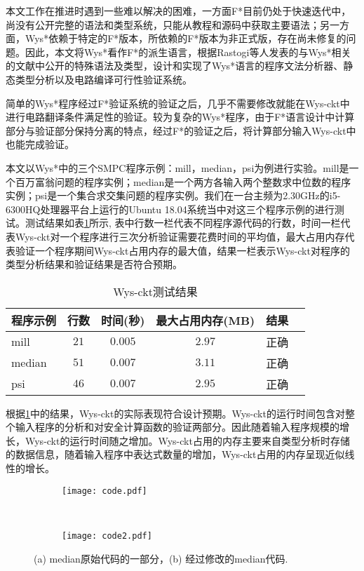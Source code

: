 本文工作在推进时遇到一些难以解决的困难，一方面F*目前仍处于快速迭代中，尚没有公开完整的语法和类型系统，只能从教程和源码中获取主要语法；另一方面，Wys*依赖于特定的F*版本，所依赖的F*版本为非正式版，存在尚未修复的问题。因此，本文将Wys*看作F*的派生语言，根据Rastogi等人发表的与Wys*相关的文献\citep{rastogi2017wys, rastogi2014wysteria,rastogi2019textsc}中公开的特殊语法及类型，设计和实现了Wys*语言的程序文法分析器、静态类型分析以及电路编译可行性验证系统。

简单的Wys*程序经过F*验证系统的验证之后，几乎不需要修改就能在Wys-ckt中进行电路翻译条件满足性的验证。较为复杂的Wys*程序，由于F*语言设计中计算部分与验证部分保持分离的特点，经过F*的验证之后，将计算部分输入Wys-ckt中也能完成验证。

本文以Wys*中的三个SMPC程序示例：mill，median，psi为例进行实验。mill是一个百万富翁问题的程序实例；median是一个两方各输入两个整数求中位数的程序实例；psi是一个集合求交集问题的程序实例。我们在一台主频为2.30GHz的i5-6300HQ处理器平台上运行的Ubuntu 18.04系统当中对这三个程序示例的进行测试。测试结果如表\ref{tab:result}所示, 表中行数一栏代表不同程序源代码的行数，时间一栏代表Wys-ckt对一个程序进行三次分析验证需要花费时间的平均值，最大占用内存代表验证一个程序期间Wys-ckt占用内存的最大值，结果一栏表示Wys-ckt对程序的类型分析结果和验证结果是否符合预期。
\begin{table}[!htbp]
    \caption{Wys-ckt测试结果}
    \label{tab:result}
    \centering
    \footnotesize%
    \setlength{\tabcolsep}{4pt}%
    \renewcommand{\arraystretch}{1.2}%
    \begin{tabular}{lccccc}
        \hline
        程序示例 & 行数 & 时间(秒) & 最大占用内存(MB) & 结果 \\
        \hline
        mill   & $21$ & $0.005$ & $2.97$ & 正确 \\
        median & $51$ & $0.007$ & $3.11$ & 正确 \\
        psi    & $46$ & $0.007$ & $2.95$ & 正确 \\
        \hline
    \end{tabular}
\end{table}

根据\ref{tab:result}中的结果，Wys-ckt的实际表现符合设计预期。Wys-ckt的运行时间包含对整个输入程序的分析和对安全计算函数的验证两部分。因此随着输入程序规模的增长，Wys-ckt的运行时间随之增加。Wys-ckt占用的内存主要来自类型分析时存储的数据信息，随着输入程序中表达式数量的增加，Wys-ckt占用的内存呈现近似线性的增长。
\begin{figure}[!htbp]
    \centering
    \begin{subfigure}[b]{0.4\textwidth}
      \texttt{[image: code.pdf]}
      \caption{}
      \label{fig:code}
    \end{subfigure}%
    ~%
    \begin{subfigure}[b]{0.4\textwidth}
      \texttt{[image: code2.pdf]}
      \caption{}
      \label{fig:code2}
    \end{subfigure}
    \caption{(a) median原始代码的一部分，(b) 经过修改的median代码.}
    \label{fig:codeall}
\end{figure}

